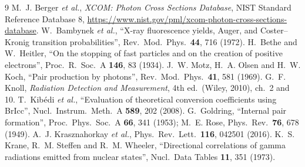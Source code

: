 \begin{thebibliography}{9}
 M.~J. Berger \emph{et al.}, \emph{XCOM: Photon Cross Sections Database}, NIST Standard Reference Database 8, \url{https://www.nist.gov/pml/xcom-photon-cross-sections-database}.
 W.~Bambynek \emph{et al.}, ``X-ray fluorescence yields, Auger, and Coster--Kronig transition probabilities'', Rev.\ Mod.\ Phys.\ \textbf{44}, 716 (1972).
 H.~Bethe and W.~Heitler, ``On the stopping of fast particles and on the creation of positive electrons'', Proc.\ R.\ Soc.\ A \textbf{146}, 83 (1934).
 J.~W. Motz, H.~A. Olsen and H.~W. Koch, ``Pair production by photons'', Rev.\ Mod.\ Phys.\ \textbf{41}, 581 (1969).
 G.~F. Knoll, \emph{Radiation Detection and Measurement}, 4th ed.\ (Wiley, 2010), ch.~2 and 10.
 T.~Kib\'edi \emph{et al.}, ``Evaluation of theoretical conversion coefficients using BrIcc'', Nucl.\ Instrum.\ Meth.\ A \textbf{589}, 202 (2008).
 G.~Goldring, ``Internal pair formation'', Proc.\ Phys.\ Soc.\ A \textbf{66}, 341 (1953); M.~E. Rose, Phys.\ Rev.\ \textbf{76}, 678 (1949).
 A.~J. Krasznahorkay \emph{et al.}, Phys.\ Rev.\ Lett.\ \textbf{116}, 042501 (2016).
 K.~S. Krane, R.~M. Steffen and R.~M. Wheeler, ``Directional correlations of gamma radiations emitted from nuclear states'', Nucl.\ Data Tables \textbf{11}, 351 (1973).
\end{thebibliography}

